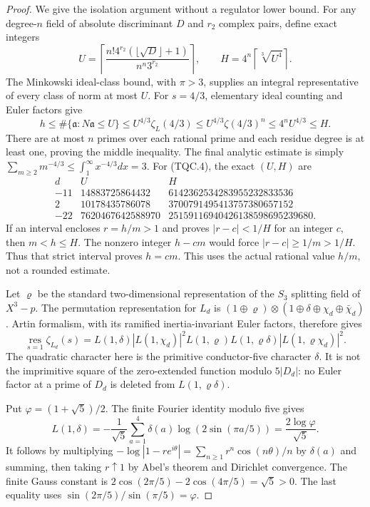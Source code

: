 \begin{proof}
We give the isolation argument without a regulator lower bound.
For any degree-$n$ field of absolute discriminant $D$ and $r_2$
complex pairs, define exact integers
\[
 U=\left\lceil\frac{n!4^{r_2}(\lfloor\sqrt D\rfloor+1)}
                         {n^n3^{r_2}}\right\rceil,
 \qquad H=4^n\left\lceil\sqrt[3]{U^4}\right\rceil.
 \tag{TQC.11}
\]
The Minkowski ideal-class bound, with $\pi>3$, supplies an
integral representative of every class of norm at most $U$.
For $s=4/3$, elementary ideal counting and Euler factors give
\[
 h\le\#\{\mathfrak a:N\mathfrak a\le U\}
 \le U^{4/3}\zeta_L(4/3)
 \le U^{4/3}\zeta(4/3)^n
 \le4^n U^{4/3}\le H.
 \tag{TQC.12}
\]
There are at most $n$ primes over each rational prime and each
residue degree is at least one, proving the middle inequality.
The final analytic estimate is simply
$\sum_{m\ge2}m^{-4/3}\le\int_1^\infty x^{-4/3}dx=3$.
For (TQC.4), the exact $(U,H)$ are
\[
\begin{array}{c|r|r}
d&U&H\\\hline
-11&14883725864432&6142362534283955232833536\\
2&10178435786078&3700791495413757380657152\\
-22&7620467642588970&25159116940426138598695239680.
\end{array}
\tag{TQC.13}
\]
If an interval encloses $r=h/m>1$ and proves
$|r-c|<1/H$ for an integer $c$, then $m<h\le H$.
The nonzero integer $h-cm$ would force
$|r-c|\ge1/m>1/H$.  Thus that strict interval proves $h=cm$.
This uses the actual rational value $h/m$, not a rounded estimate.

Let $\varrho$ be the standard two-dimensional representation of
the $S_3$ splitting field of $X^3-p$.
The permutation representation for $L_d$ is
$(1\oplus\varrho)\otimes(1\oplus\delta\oplus\chi_d\oplus\bar\chi_d)$.
Artin formalism, with its ramified inertia-invariant Euler factors,
therefore gives
\[
 \operatorname*{res}_{s=1}\zeta_{L_d}(s)
 =L(1,\delta)|L(1,\chi_d)|^2
       L(1,\varrho)L(1,\varrho\delta)|L(1,\varrho\chi_d)|^2.
 \tag{TQC.14}
\]
The quadratic character here is the primitive conductor-five
character $\delta$.  It is not the imprimitive square of the
zero-extended function modulo $5|D_d|$: no Euler factor at a prime
of $D_d$ is deleted from $L(1,\varrho\delta)$.

Put $\varphi=(1+\sqrt5)/2$.
The finite Fourier identity modulo five gives
\[
 L(1,\delta)=-\frac1{\sqrt5}\sum_{a=1}^{4}\delta(a)
             \log(2\sin(\pi a/5))=\frac{2\log\varphi}{\sqrt5}.
 \tag{TQC.15}
\]
It follows by multiplying
$-\log|1-re^{i\theta}|=\sum_{n\ge1}r^n\cos(n\theta)/n$
by $\delta(a)$ and summing, then taking $r\uparrow1$ by Abel's
theorem and Dirichlet convergence.  The finite Gauss constant is
$2\cos(2\pi/5)-2\cos(4\pi/5)=\sqrt5>0$.
The last equality uses $\sin(2\pi/5)/\sin(\pi/5)=\varphi$.


\end{proof}
